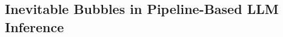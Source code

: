 





\subsection{Inevitable Bubbles in Pipeline-Based LLM Inference}
\label{sec:pipelinebubble}



